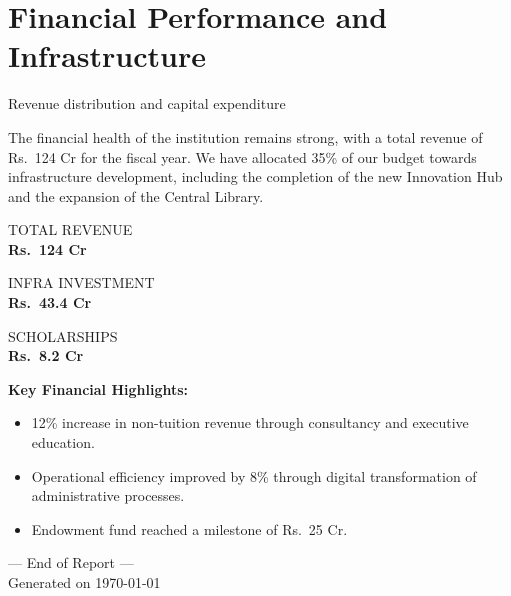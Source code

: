 \documentclass[11pt,a4paper]{article}
\newcommand{\rupee}{Rs.~}
\newcommand{\kpi}[2]{
    \begin{tcolorbox}[colback=gray!5, colframe=gray!10, arc=5pt, boxrule=0.5pt, halign=center]
        {\footnotesize\uppercase{\textcolor{muted}{#1}}}\\[0.1cm]
        {\Large\textbf{\textcolor{primary}{#2}}}
    \end{tcolorbox}
}
\newenvironment{card}{
    \begin{tcolorbox}[colback=white, colframe=gray!20, arc=5pt, boxrule=0.5pt, left=15pt, right=15pt, top=15pt, bottom=15pt]
}{
    \end{tcolorbox}
}
\begin{document}
\clearpage

\section*{Financial Performance and Infrastructure}
{\large\textcolor{muted}{Revenue distribution and capital expenditure}}

\vspace{0.5cm}

\begin{card}
    The financial health of the institution remains strong, with a total revenue of \rupee 124 Cr for the fiscal year. We have allocated 35\% of our budget towards infrastructure development, including the completion of the new Innovation Hub and the expansion of the Central Library.
    
    \vspace{0.5cm}
    
    \begin{minipage}[t]{0.31\textwidth}
        \kpi{Total Revenue}{\rupee 124 Cr}
    \end{minipage}%
    \hfill
    \begin{minipage}[t]{0.31\textwidth}
        \kpi{Infra Investment}{\rupee 43.4 Cr}
    \end{minipage}%
    \hfill
    \begin{minipage}[t]{0.31\textwidth}
        \kpi{Scholarships}{\rupee 8.2 Cr}
    \end{minipage}
    
    \vspace{0.8cm}
    
    \textbf{Key Financial Highlights:}
    \begin{itemize}[label=\textcolor{primary}{$\bullet$}]
        \item 12\% increase in non-tuition revenue through consultancy and executive education.
        \item Operational efficiency improved by 8\% through digital transformation of administrative processes.
        \item Endowment fund reached a milestone of \rupee 25 Cr.
    \end{itemize}
\end{card}

\vspace{2cm}

\begin{center}
    \textcolor{muted}{\small --- End of Report ---}\\
    \vspace{0.2cm}
    \textcolor{muted}{\footnotesize Generated on \today}
\end{center}
\end{document}
